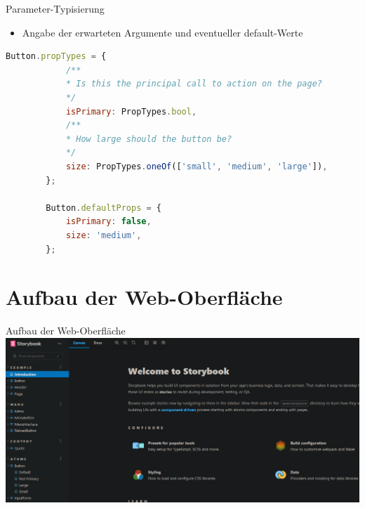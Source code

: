 \documentclass{beamer}
\begin{document}
\begin{frame}[fragile]{Parameter-Typisierung}
	\begin{itemize}
		\item Angabe der erwarteten Argumente und eventueller default-Werte
	\end{itemize}
	\begin{lstlisting}[language=JavaScript]
		Button.propTypes = {
			/**
			* Is this the principal call to action on the page?
			*/
			isPrimary: PropTypes.bool,
			/**
			* How large should the button be?
			*/
			size: PropTypes.oneOf(['small', 'medium', 'large']),
		};
	
		Button.defaultProps = {
			isPrimary: false,
			size: 'medium',
		};
	\end{lstlisting}
\end{frame}

\section{Aufbau der Web-Oberfläche} %

\begin{frame}{Aufbau der Web-Oberfläche}
	\includegraphics[width=\textwidth]{Images/web-ui/whole-ui.png}
\end{frame}
\end{document}
